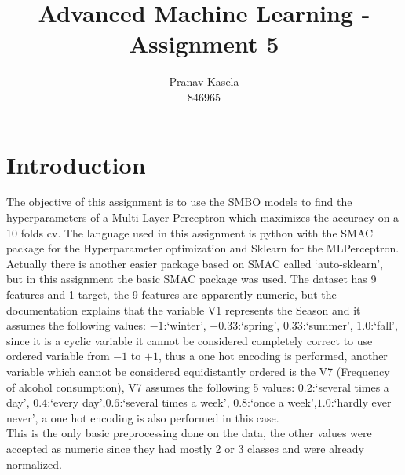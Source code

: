 \documentclass[12pt, onecolumn]{article}
\title{Advanced Machine Learning - Assignment 5}
\author{Pranav Kasela \\$846965$}
\date{}
\begin{document}
\maketitle
\section*{Introduction}
The objective of this assignment is to use the SMBO models to find the hyperparameters of a Multi Layer Perceptron which maximizes the accuracy on a 10 folds cv.
The language used in this assignment is python with the SMAC package for the Hyperparameter optimization and Sklearn for the MLPerceptron.
Actually there is another easier package based on SMAC called `auto-sklearn', but in this assignment the basic SMAC package was used.
The dataset has 9 features and 1 target, the 9 features are apparently numeric, but the documentation explains that the variable V1 represents the Season and it assumes the following values: $-1$:`winter', $-0.33$:`spring', $0.33$:`summer', $1.0$:`fall', since it is a cyclic variable it cannot be considered completely correct to use ordered variable from $-1$ to $+1$, thus a one hot encoding is performed, another variable which cannot be considered equidistantly ordered is the V7 (Frequency of alcohol consumption), V7 assumes the following 5 values: $0.2$:`several times a day', $0.4$:`every day',$0.6$:`several times a week',  $0.8$:`once a week',$1.0$:`hardly ever never', a one hot encoding is also performed in this case.\\
This is the only basic preprocessing done on the data, the other values were accepted as numeric since they had mostly 2 or 3 classes and were already normalized.
\end{document}
